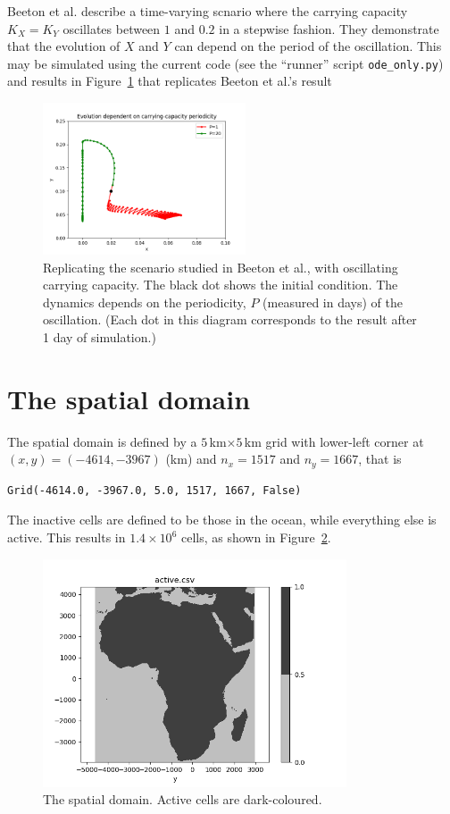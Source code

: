 \documentclass{article}
\begin{document}
Beeton et al. describe a time-varying scnario where the carrying capacity $K_{X}=K_{Y}$ oscillates between $1$ and $0.2$ in a stepwise fashion.  They demonstrate that the evolution of $X$ and $Y$ can depend on the period of the oscillation.  This may be simulated using the current code (see the ``runner'' script {\tt ode\_only.py}) and results in Figure~\ref{ode_only.fig} that replicates Beeton et al.'s result

\begin{figure}[htb]
  \centering
  \includegraphics[width=6cm]{ode_only.png}
  \caption{\label{ode_only.fig}Replicating the scenario studied in Beeton et al., with oscillating carrying capacity.  The black dot shows the initial condition.  The dynamics depends on the periodicity, $P$ (measured in days) of the oscillation.  (Each dot in this diagram corresponds to the result after 1 day of simulation.)}
\end{figure}


\section{The spatial domain}

The spatial domain is defined by a $5$\,km$\times 5$\,km grid with lower-left corner at $(x,y)=(-4614,-3967)$ (km) and $n_{x}=1517$ and $n_{y}=1667$, that is
\begin{verbatim}
Grid(-4614.0, -3967.0, 5.0, 1517, 1667, False)
\end{verbatim}
The inactive cells are defined to be those in the ocean, while everything else is active.  This results in $1.4\times 10^{6}$ cells, as shown in Figure~\ref{active_inactive.fig}.

\begin{figure}[htb]
  \centering
  \includegraphics[width=9cm]{active.png}
  \caption{\label{active_inactive.fig}The spatial domain.  Active cells are dark-coloured.}
\end{figure}
\end{document}
